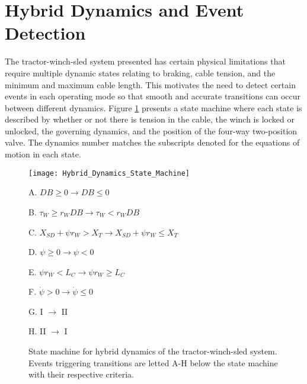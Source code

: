 \section{Hybrid Dynamics and Event Detection}
The tractor-winch-sled system presented has certain physical limitations that require multiple dynamic states relating to braking, cable tension, and the minimum and maximum cable length. This motivates the need to detect certain events in each operating mode so that smooth and accurate transitions can occur between different dynamics. Figure \ref{fig:Hybrid_Dynamics_State_Machine} presents a state machine where each state is described by whether or not there is tension in the cable, the winch is locked or unlocked, the governing dynamics, and the position of the four-way two-position valve. The dynamics number matches the subscripts denoted for the equations of motion in each state.
\begin{figure}[htb]
    \centering
    \texttt{[image: Hybrid\_Dynamics\_State\_Machine]}
    \vspace{-5pt}
    \centering
    \begin{myitemize}
        \footnotesize
        \item A. \hspace{0.1cm} $DB \geq 0 \rightarrow DB \leq 0$
        \item B. \hspace{0.1cm} $\tau_W \geq r_WDB \rightarrow \tau_W < r_WDB $
        \item C. \hspace{0.1cm} $X_{SD} + \psi r_W > X_T \rightarrow X_{SD} + \psi r_W \leq X_T$
        \item D. \hspace{0.1cm} $\psi \geq 0 \rightarrow \psi < 0$
        \item E. \hspace{0.1cm} $\psi r_W < L_C \rightarrow \psi r_W \geq L_C$
        \item F. \hspace{0.1cm} $\dot\psi > 0 \rightarrow \dot\psi \leq 0$
        \item G. \hspace{0.1cm} I $\rightarrow$ II
        \item H. \hspace{0.1cm} II $\rightarrow$ I
    \end{myitemize}
    \vspace{-10pt}
    \caption{State machine for hybrid dynamics of the tractor-winch-sled system. Events triggering transitions are letted A-H below the state machine with their respective criteria.}
    \vspace{-10pt}
    \label{fig:Hybrid_Dynamics_State_Machine}
\end{figure}
